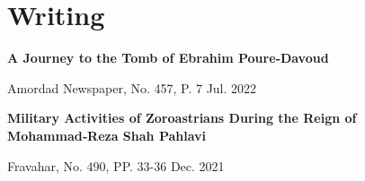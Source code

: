 \documentclass{article}
\begin{document}
\newpage


\section*{\textcolor{BrickRed}{Wri}ting  \noindent\hrulefill}

\hspace{5mm}
\textbf{A Journey to the Tomb of Ebrahim Poure‑Davoud}

\hspace{10mm}
Amordad Newspaper, No. 457, P. 7 \hfill Jul. 2022

\vspace{5mm}

\hspace{5mm}
\textbf{Military Activities of Zoroastrians During the Reign of Mohammad‑Reza Shah Pahlavi }

\hspace{10mm}
Fravahar, No. 490, PP. 33-36 \hfill Dec. 2021
\end{document}
